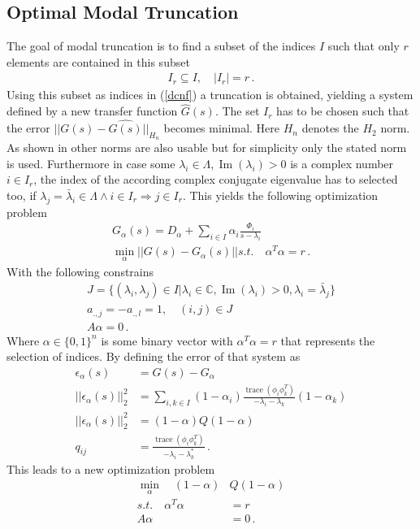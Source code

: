 \subsection{Optimal Modal Truncation}
The goal of modal truncation is to find a subset of the indices \(I\)  such that only \(r\) elements are contained in this subset
\begin{gather}
I_r \subseteq I, \quad |I_r| = r \,.
\end{gather}
Using this subset as indices in (\ref{dcnf}) a truncation is obtained, yielding a system defined by a new transfer function \(\hat{G}(s)\).
The set \(I_r\) has to be chosen such that the error \(||G(s) - \hat{G(s)}||_{H_n}\) becomes minimal.
Here  \(H_n\) denotes the \(H_2\)  norm.
As shown in \cite{vuillemin2020optimal} other norms are also usable but for simplicity only the stated norm is used.
Furthermore in case some \(\lambda_i \in \Lambda, \operatorname{Im}(\lambda_i) > 0\) is a complex number  \(i \in I_r\), the index of the according complex conjugate eigenvalue has to selected too, if \(\lambda_j = \bar{\lambda}_i \in \Lambda \wedge i \in I_r \Rightarrow j \in I_r\). 
This yields the following optimization problem
\begin{gather}
G_{\alpha}(s) = D_{\alpha} + \sum_{i \in I} \alpha_i \frac{\Phi_i}{s - \lambda_i} \\ 
\min_{\alpha} ||G(s) - G_{\alpha}(s)|| s.t. \quad
\alpha^{T}\alpha = r \,.
\end{gather}
With the following constrains
\begin{gather}
J = \{(\lambda_i, \lambda_j) \in I | \lambda_i \in \mathbb{C}, \operatorname{Im}(\lambda_i) > 0, \lambda_i = \bar{\lambda}_j\} \\
a_{.,j} = -a_{.,l} = 1, \quad	(i, j) \in J \\
A\alpha = 0 \,.
\end{gather}
Where \(\alpha \in \{0, 1\}^{n}\) is some binary vector with \(\alpha^{T} \alpha = r\) that represents the selection of indices.
By defining the error of that system as
\begin{align}
\epsilon_{\alpha}(s) &= G(s) - G_{\alpha} \\
||\epsilon_{\alpha}(s)||_2^2 &= \sum_{i, k \in I} (1-\alpha_i) \frac{\operatorname{trace}(\phi_i \phi_k^{T})}{-\lambda_i - \lambda_k}(1-\alpha_k) \\
||\epsilon_{\alpha}(s)||_2^2 &= (1-\alpha)Q(1-\alpha) \\
q_{ij} &= \frac{\operatorname{trace}(\phi_i \phi_k^{T})}{-\lambda_i - \lambda_k^*} \,.
\end{align} 
This leads to a new optimization problem \cite{vuillemin2020optimal}
\begin{align}
\min_{\alpha} \quad (1-\alpha)&Q(1-\alpha) \label{opt-h2}\\
s.t. \quad \alpha^T\alpha &= r \\
A\alpha &= 0 \,.
\end{align}

